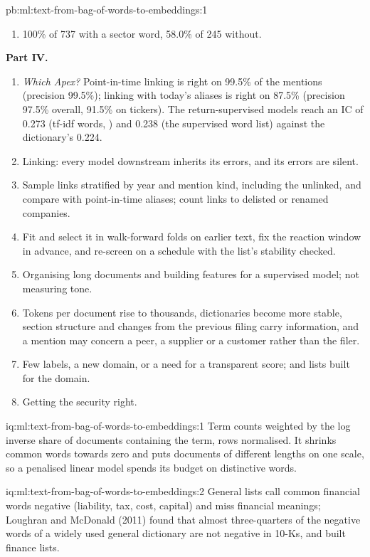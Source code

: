 \begin{solution}{pb:ml:text-from-bag-of-words-to-embeddings:1}
\begin{enumerate}[resume]
return that looks like noise or, worse, like a signal.
\item 100\% of 737 with a sector word, 58.0\% of 245 without.
\end{enumerate}
\textbf{Part IV.}
\begin{enumerate}[resume]
\item \emph{Which Apex?} Point-in-time linking is right on 99.5\% of the mentions (precision 99.5\%); linking with today's
aliases is right on 87.5\% (precision 97.5\% overall, 91.5\% on tickers). The return-supervised models reach an IC of 0.273
(tf-idf words, ) and 0.238 (the supervised word list) against the dictionary's 0.224.
\item Linking: every model downstream inherits its errors, and its errors are silent.
\item Sample links stratified by year and mention kind, including the unlinked, and compare with point-in-time aliases;
count links to delisted or renamed companies.
\item Fit and select it in walk-forward folds on earlier text, fix the reaction window in advance, and re-screen on a
schedule with the list's stability checked.
\item Organising long documents and building features for a supervised model; not measuring tone.
\item Tokens per document rise to thousands, dictionaries become more stable, section structure and changes from the
previous filing carry information, and a mention may concern a peer, a supplier or a customer rather than the filer.
\item Few labels, a new domain, or a need for a transparent score; and lists built for the domain.
\item Getting the security right.
\end{enumerate}
\end{solution}

\begin{solution}{iq:ml:text-from-bag-of-words-to-embeddings:1}
Term counts weighted by the log inverse share of documents containing the term, rows normalised. It shrinks common words
towards zero and puts documents of different lengths on one scale, so a penalised linear model spends its budget on
distinctive words.
\end{solution}

\begin{solution}{iq:ml:text-from-bag-of-words-to-embeddings:2}
General lists call common financial words negative (liability, tax, cost, capital) and miss financial meanings; Loughran
and McDonald (2011) found that almost three-quarters of the negative words of a widely used general dictionary are not
negative in 10-Ks, and built finance lists.
\end{solution}

